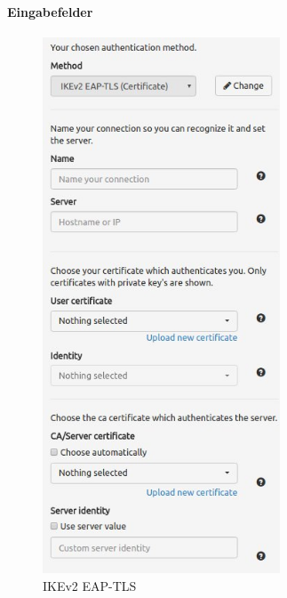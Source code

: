 \noindent\begin{minipage}[t]{0.5\textwidth}
\vspace{0pt}
\paragraph{Eingabefelder}\mbox{}\medskip
    \begin{figure}[H]
    	\centering
    	\includegraphics[width=200pt]{images/forms/tls_form.jpg}
    	\caption{IKEv2 EAP-TLS}
    \end{figure}
\end{minipage}
\hfill
